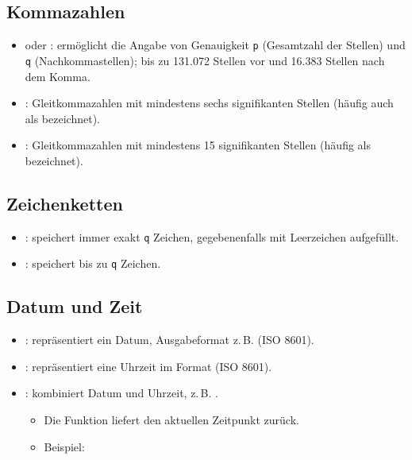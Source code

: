 \subsection{Kommazahlen}
    \begin{itemize}
        \item \textbf{} oder \textbf{}: 
        ermöglicht die Angabe von Genauigkeit \texttt{p} (Gesamtzahl der Stellen) 
        und \texttt{q} (Nachkommastellen); 
        bis zu 131.072 Stellen vor und 16.383 Stellen nach dem Komma.
        \item \textbf{}: Gleitkommazahlen mit mindestens sechs signifikanten Stellen 
        (häufig auch als  bezeichnet).
        \item \textbf{}: Gleitkommazahlen mit mindestens 15 signifikanten Stellen 
        (häufig als  bezeichnet).
    \end{itemize}

    \subsection{Zeichenketten}
    \begin{itemize}
        \item \textbf{}: speichert immer exakt \texttt{q} Zeichen, gegebenenfalls mit Leerzeichen aufgefüllt.
        \item \textbf{}: speichert bis zu \texttt{q} Zeichen.
    \end{itemize}

    \subsection{Datum und Zeit}
    \begin{itemize}
        \item \textbf{}: repräsentiert ein Datum, Ausgabeformat z.\,B.  (ISO 8601).
        \item \textbf{}: repräsentiert eine Uhrzeit im Format  (ISO 8601).
        \item \textbf{}: kombiniert Datum und Uhrzeit, z.\,B. .
        \begin{itemize}
            \item Die Funktion  liefert den aktuellen Zeitpunkt zurück.
            \item Beispiel: 
        \end{itemize}
    \end{itemize}

